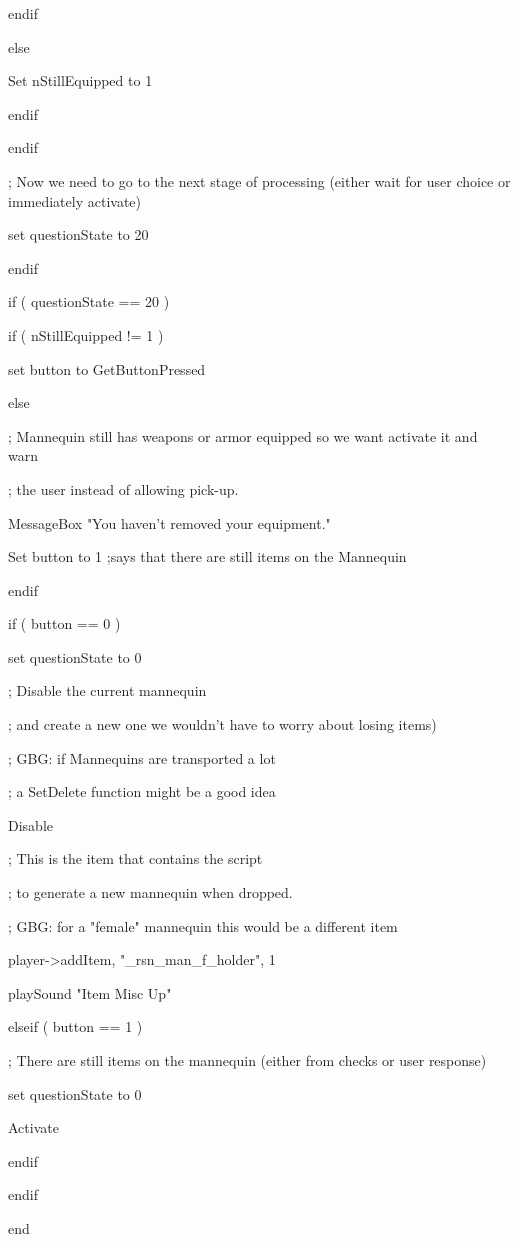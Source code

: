 \documentclass[
]{article}
\begin{document}
endif

else

Set nStillEquipped to 1

endif

endif

; Now we need to go to the next stage of processing (either wait for
user choice or immediately activate)

set questionState to 20

endif

if ( questionState == 20 )

if ( nStillEquipped != 1 )

set button to GetButtonPressed

else

; Mannequin still has weapons or armor equipped so we want activate it
and warn

; the user instead of allowing pick-up.

MessageBox "You haven't removed your equipment."

Set button to 1 ;says that there are still items on the Mannequin

endif

if ( button == 0 )

set questionState to 0

; Disable the current mannequin

; and create a new one we wouldn't have to worry about losing items)

; GBG: if Mannequins are transported a lot

; a SetDelete function might be a good idea

Disable

; This is the item that contains the script

; to generate a new mannequin when dropped.

; GBG: for a "female" mannequin this would be a different item

player-\textgreater addItem, "\_rsn\_man\_f\_holder", 1

playSound "Item Misc Up"

elseif ( button == 1 )

; There are still items on the mannequin (either from checks or user
response)

set questionState to 0

Activate

endif

endif

end
\end{document}
